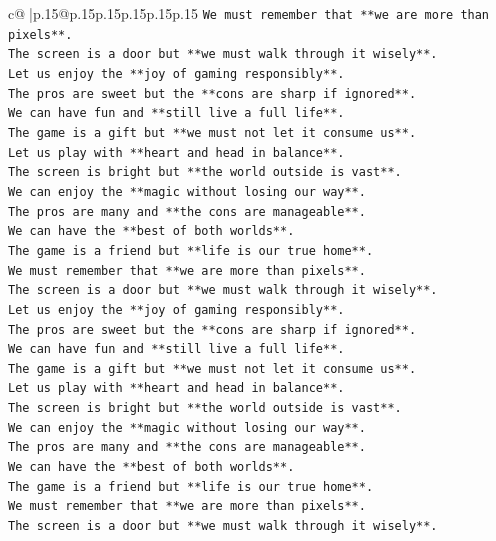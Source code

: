 \documentclass{article}
\begin{document}
{\begin{supertabular}{c@{$\;$}|p{.15\linewidth}@{}p{.15\linewidth}p{.15\linewidth}p{.15\linewidth}p{.15\linewidth}p{.15\linewidth}}
{{{\texttt{We must remember that **we are more than pixels**.} \\
\texttt{The screen is a door but **we must walk through it wisely**.} \\
\texttt{Let us enjoy the **joy of gaming responsibly**.} \\
\texttt{The pros are sweet but the **cons are sharp if ignored**.} \\
\texttt{We can have fun and **still live a full life**.} \\
\texttt{The game is a gift but **we must not let it consume us**.} \\
\texttt{Let us play with **heart and head in balance**.} \\
\texttt{The screen is bright but **the world outside is vast**.} \\
\texttt{We can enjoy the **magic without losing our way**.} \\
\texttt{The pros are many and **the cons are manageable**.} \\
\texttt{We can have the **best of both worlds**.} \\
\texttt{The game is a friend but **life is our true home**.} \\
\texttt{We must remember that **we are more than pixels**.} \\
\texttt{The screen is a door but **we must walk through it wisely**.} \\
\texttt{Let us enjoy the **joy of gaming responsibly**.} \\
\texttt{The pros are sweet but the **cons are sharp if ignored**.} \\
\texttt{We can have fun and **still live a full life**.} \\
\texttt{The game is a gift but **we must not let it consume us**.} \\
\texttt{Let us play with **heart and head in balance**.} \\
\texttt{The screen is bright but **the world outside is vast**.} \\
\texttt{We can enjoy the **magic without losing our way**.} \\
\texttt{The pros are many and **the cons are manageable**.} \\
\texttt{We can have the **best of both worlds**.} \\
\texttt{The game is a friend but **life is our true home**.} \\
\texttt{We must remember that **we are more than pixels**.} \\
\texttt{The screen is a door but **we must walk through it wisely**.} \\
}}}
\end{supertabular}}
\end{document}
